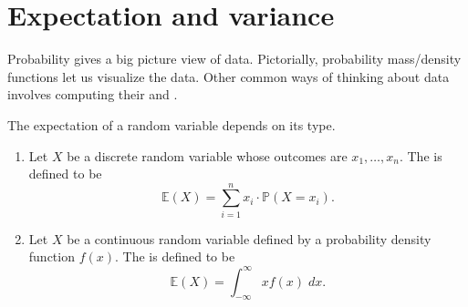 \documentclass[../main.tex]{subfiles}
\begin{document}
 \section{Expectation and variance}

Probability gives a big picture view of data. Pictorially, probability mass/density functions let us visualize the data. Other common ways of thinking about data involves computing their  and . 

\begin{definition}[expectation]
  The expectation of a random variable depends on its type.

  \begin{enumerate}
    \item Let \(X\) be a discrete random variable whose outcomes are \(x_{1}, \ldots, x_{n}\). The  is defined to be
      \[
        \mathbb{E}(X) = \sum_{i = 1}^{n} x_{i} \cdot \mathbb{P}(X = x_{i}).
      \]

    \item Let \(X\) be a continuous random variable defined by a probability density function \(f(x)\). The  is defined to be
      \[
        \mathbb{E}(X) = \int_{-\infty}^{\infty} x f(x) \;dx.
      \]
  \end{enumerate}
\end{definition}
\end{document}
